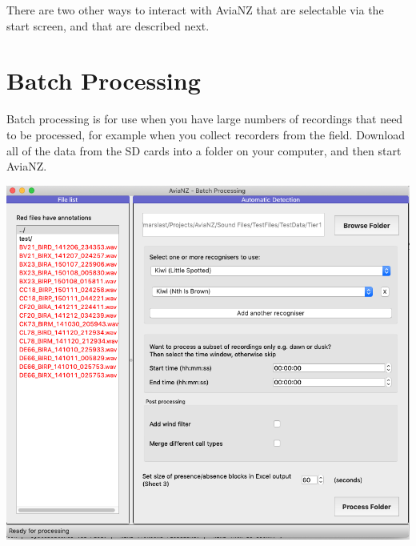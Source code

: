 \documentclass{article}
\begin{document}
There are two other ways to interact with AviaNZ that are selectable via the start screen, and that are described next. 

\newpage
\section{Batch Processing}
\label{sec:auto}

Batch processing is for use when you have large numbers of recordings that need to be processed, for example when you collect recorders from the field. Download all of the data from the SD cards into a folder on your computer, and then start AviaNZ. 

\begin{center}
\includegraphics[width=.5\textwidth]{Figs/Batch1}
\end{center}
\end{document}
